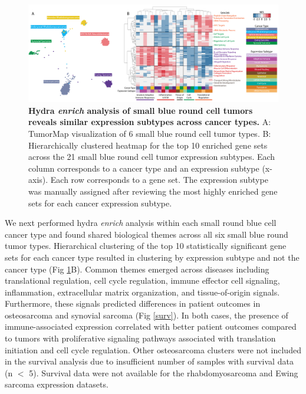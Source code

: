 \documentclass[10pt,letterpaper]{article}
\begin{document}
\begin{figure}[!h]
	\includegraphics[width=\textwidth]{img/PNG/hydra-pan-small-round-blue-V2-2x}
	\caption{{\bf Hydra \textit{enrich} analysis of small blue round cell tumors reveals similar expression subtypes across cancer types.} A: TumorMap visualization of 6 small blue round cell tumor types. B: Hierarchically clustered heatmap for the top 10 enriched gene sets across the 21 small blue round cell tumor expression subtypes. Each column corresponds to a cancer type and an expression subtype (x-axis). Each row corresponds to a gene set. The expression subtype was manually assigned after reviewing the most highly enriched gene sets for each cancer expression subtype.}
	\label{pancan}
\end{figure}

We next performed hydra \textit{enrich} analysis within each small round blue cell cancer type and found shared biological themes across all six small blue round tumor types. Hierarchical clustering of the top 10 statistically significant gene sets for each cancer type resulted in clustering by expression subtype and not the cancer type (Fig \ref{pancan}B). Common themes emerged across diseases including translational regulation, cell cycle regulation, immune effector cell signaling, inflammation, extracellular matrix organization, and tissue-of-origin signals. Furthermore, these signals predicted differences in patient outcomes in osteosarcoma and synovial sarcoma (Fig \ref{surv}). In both cases, the presence of immune-associated expression correlated with better patient outcomes compared to tumors with proliferative signaling pathways associated with translation initiation and cell cycle regulation. Other osteosarcoma clusters were not included in the survival analysis due to insufficient number of samples with survival data (n $<$ 5). Survival data were not available for the rhabdomyosarcoma and Ewing sarcoma expression datasets.

%
%
\end{document}
